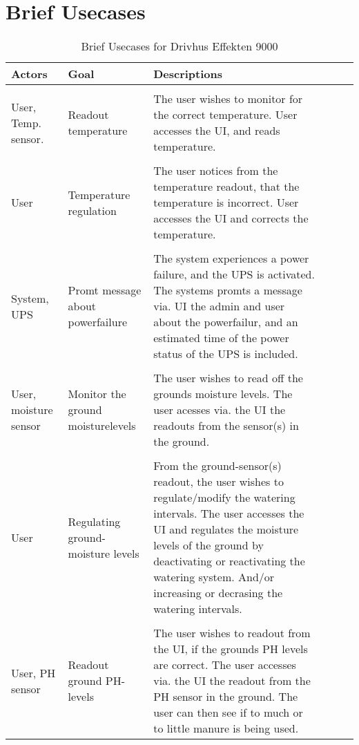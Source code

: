 \chapter{Brief Usecases}

\begin{table}[]
	\centering
	\caption{Brief Usecases for Drivhus Effekten 9000}
	\label{DE:BU}
	\begin{tabularx}{360pt}{ TX TX TX}
		\hline
		\textbf{Actors} & \textbf{Goal} & \textbf{Descriptions} \\
		\hline\\
		User, Temp. sensor. & Readout temperature & The user wishes to monitor for the correct temperature.
		User accesses the UI, and reads temperature.  \\
		\hline \\
		User & Temperature regulation & The user notices from the temperature readout,
		that the temperature is incorrect. User accesses the UI and corrects the temperature.\\
		\hline \\
		System, UPS & Promt message about powerfailure & The system experiences a power failure, and the UPS is activated. The systems promts a message via. UI the admin and user about the powerfailur, and an estimated time of the power status of the UPS is included. \\
		\hline\\
		User, moisture sensor & Monitor the ground moisturelevels & The user wishes to read off the grounds moisture levels. The user acesses via. the UI the readouts from the sensor(s) in the ground. \\
		\hline\\
		User & Regulating ground-moisture levels & From the ground-sensor(s) readout, the user wishes to regulate/modify the watering intervals. The user accesses the UI and regulates the moisture levels of the ground by deactivating or reactivating the watering system. And/or increasing or decrasing the watering intervals. \\
		\hline\\
		User, PH sensor & Readout ground PH-levels & The user wishes to readout from the UI, if the grounds PH levels are correct. The user accesses via. the UI the readout from the PH sensor in the ground. The user can then see if to much or to little manure is being used. \\
		
	\end{tabularx}
\end{table}